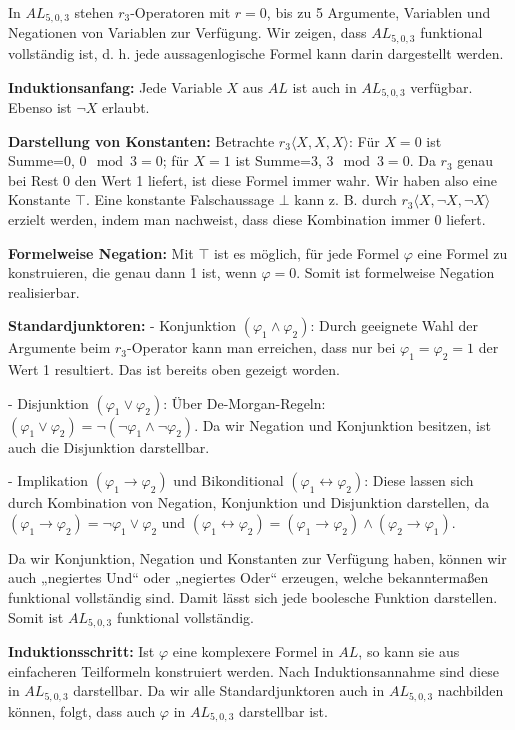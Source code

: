 \documentclass[12pt,a4paper]{article}
\begin{document}
In $AL_{5,0,3}$ stehen $r_3$-Operatoren mit $r=0$, bis zu 5 Argumente, Variablen und Negationen von Variablen zur Verfügung. Wir zeigen, dass $AL_{5,0,3}$ funktional vollständig ist, d. h. jede aussagenlogische Formel kann darin dargestellt werden.

\textbf{Induktionsanfang:}  
Jede Variable $X$ aus $AL$ ist auch in $AL_{5,0,3}$ verfügbar. Ebenso ist $\neg X$ erlaubt.

\textbf{Darstellung von Konstanten:}  
Betrachte $r_3\langle X,X,X\rangle$: Für $X=0$ ist Summe=0, $0 \mod3=0$; für $X=1$ ist Summe=3, $3 \mod3=0$. Da $r_3$ genau bei Rest 0 den Wert 1 liefert, ist diese Formel immer wahr. Wir haben also eine Konstante $\top$.  
Eine konstante Falschaussage $\bot$ kann z. B. durch $r_3\langle X,\neg X,\neg X\rangle$ erzielt werden, indem man nachweist, dass diese Kombination immer 0 liefert.

\textbf{Formelweise Negation:}  
Mit $\top$ ist es möglich, für jede Formel $\varphi$ eine Formel zu konstruieren, die genau dann 1 ist, wenn $\varphi=0$. Somit ist formelweise Negation realisierbar.

\textbf{Standardjunktoren:}  
- Konjunktion $(\varphi_1 \land \varphi_2)$:  
  Durch geeignete Wahl der Argumente beim $r_3$-Operator kann man erreichen, dass nur bei $\varphi_1=\varphi_2=1$ der Wert 1 resultiert. Das ist bereits oben gezeigt worden.
  
- Disjunktion $(\varphi_1 \lor \varphi_2)$:  
  Über De-Morgan-Regeln: $(\varphi_1 \lor \varphi_2)=\neg(\neg \varphi_1 \land \neg \varphi_2)$. Da wir Negation und Konjunktion besitzen, ist auch die Disjunktion darstellbar.

- Implikation $(\varphi_1 \to \varphi_2)$ und Bikonditional $(\varphi_1 \leftrightarrow \varphi_2)$:
  Diese lassen sich durch Kombination von Negation, Konjunktion und Disjunktion darstellen, da $(\varphi_1 \to \varphi_2)=\neg \varphi_1 \lor \varphi_2$ und $(\varphi_1 \leftrightarrow \varphi_2)=(\varphi_1 \to \varphi_2) \land (\varphi_2 \to \varphi_1)$.

Da wir Konjunktion, Negation und Konstanten zur Verfügung haben, können wir auch „negiertes Und“ oder „negiertes Oder“ erzeugen, welche bekanntermaßen funktional vollständig sind. Damit lässt sich jede boolesche Funktion darstellen. Somit ist $AL_{5,0,3}$ funktional vollständig.

\textbf{Induktionsschritt:}  
Ist $\varphi$ eine komplexere Formel in $AL$, so kann sie aus einfacheren Teilformeln konstruiert werden. Nach Induktionsannahme sind diese in $AL_{5,0,3}$ darstellbar. Da wir alle Standardjunktoren auch in $AL_{5,0,3}$ nachbilden können, folgt, dass auch $\varphi$ in $AL_{5,0,3}$ darstellbar ist.

\bigskip
\end{document}

